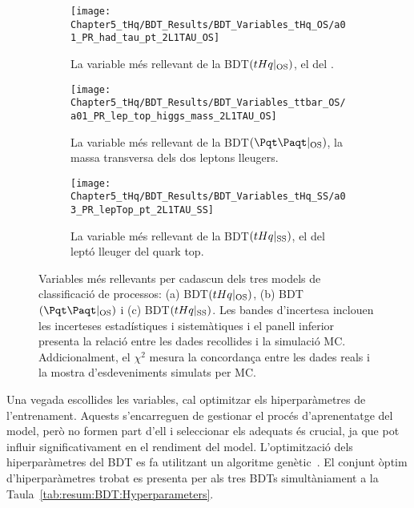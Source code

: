 \begin{figure}[h]
  \centering  
  \begin{subfigure}[b]{0.49\textwidth}
    \centering
    \texttt{[image: Chapter5\_tHq/BDT\_Results/BDT\_Variables\_tHq\_OS/a01\_PR\_had\_tau\_pt\_2L1TAU\_OS]}
    \caption{La variable més rellevant de la BDT$(tHq|_{\text{OS}})$, el \pT del \tauhad.}
     \label{fig:resum:EventSelection:BDT:VariablesRelevants:tHqOS}
  \end{subfigure}
  \hfill
  \begin{subfigure}[b]{0.49\textwidth}
    \centering
    \texttt{[image: Chapter5\_tHq/BDT\_Results/BDT\_Variables\_ttbar\_OS/a01\_PR\_lep\_top\_higgs\_mass\_2L1TAU\_OS]}
    \caption{La variable més rellevant de la BDT$(\ttbar|_{\text{OS}})$, la massa transversa dels dos leptons lleugers. }
     \label{fig:resum:EventSelection:BDT:VariablesRelevants:ttbarOS}
  \end{subfigure}
    \hfill
  \begin{subfigure}[b]{0.49\textwidth}
    \centering
    \texttt{[image: Chapter5\_tHq/BDT\_Results/BDT\_Variables\_tHq\_SS/a03\_PR\_lepTop\_pt\_2L1TAU\_SS]}
    \caption{La variable més rellevant de la BDT$(tHq|_{\text{SS}})$, el \pT del leptó lleuger del quark top.}
     \label{fig:resum:EventSelection:BDT:VariablesRelevants:tHqSS}
  \end{subfigure}
  \caption{Variables més rellevants per  cadascun dels tres models de classificació de processos: (a) BDT$(tHq|_{\text{OS}})$, 
  	      (b) BDT$(\ttbar|_{\text{OS}})$ i (c) BDT$(tHq|_{\text{SS}})$. Les bandes d'incertesa inclouen les incerteses estadístiques 
	      i sistemàtiques i el panell inferior presenta la relació entre les dades recollides i la simulació MC. Addicionalment, el 
	      $\chi^2$ mesura la concordança entre les dades reals i la mostra d'esdeveniments simulats per MC.} 
  \label{fig:resum:EventSelection:BDT:VariablesRelevants}
\end{figure}



Una vegada escollides les variables, cal optimitzar els hiperparàmetres de l'entrenament. Aquests s'encarreguen
de gestionar el procés d'aprenentatge del model, però no formen part d'ell i seleccionar els adequats és crucial, 
ja que pot influir significativament en el rendiment del model. L'optimització dels hiperparàmetres del BDT es fa utilitzant
un algoritme genètic~\cite{MitchellGA}. El conjunt òptim d'hiperparàmetres trobat es presenta per als tres
BDTs simultàniament a la Taula~\ref{tab:resum:BDT:Hyperparameters}.


